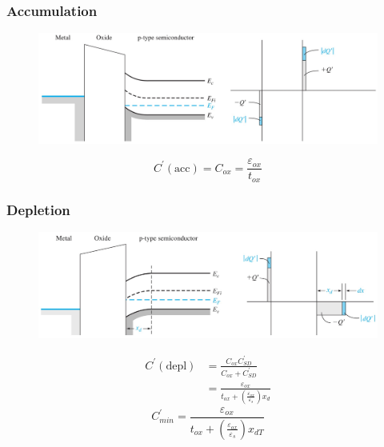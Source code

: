 \documentclass{beamer}
\begin{document}
    \begin{frame} \frametitle{Accumulation}
        \begin{figure}[H]
            \centering
            \includegraphics[width=0.9\linewidth]{C-V-accumulation.jpg}
            \label{fig:C-V-accumulation.jpg}
        \end{figure}
        \begin{equation*}
            C^\prime (\text{acc}) = C_{ox} = \frac{\varepsilon_{ox} }{t_{ox} }  
        \end{equation*}
    \end{frame}
    \begin{frame} \frametitle{Depletion}
        \begin{figure}[H]
            \centering
            \includegraphics[width=0.9\linewidth]{C-V-depletion.jpg}
            \label{fig:C-V-depletion.jpg}
        \end{figure}
        \begin{equation*}
            \begin{aligned}
                C^\prime (\text{depl}) &= \frac{C_{ox} C^\prime_{SD} }{C_{ox} + C^\prime_{SD} } \\
                &= \frac{\varepsilon_{ox} }{t_{ox} + \left( \frac{\varepsilon_{ox} }{\varepsilon_s}  \right)x_d } 
            \end{aligned}
        \end{equation*}
        \begin{equation*}
            C^\prime_{min} = \frac{\varepsilon_{ox} }{t_{ox} + \left( \frac{\varepsilon_{ox} }{\varepsilon_s}  \right) x_{dT} } 
        \end{equation*}
    \end{frame}
\end{document}
